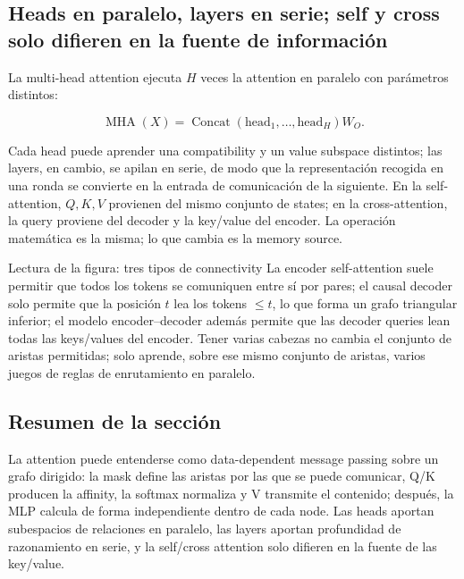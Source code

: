 \subsection{Heads en paralelo, layers en serie; self y cross solo difieren en la fuente de información}

La multi-head attention ejecuta $H$ veces la attention en paralelo con parámetros distintos:

\[
\operatorname{MHA}(X)=\operatorname{Concat}(\text{head}_1,\ldots,\text{head}_H)W_O.
\]

Cada head puede aprender una compatibility y un value subspace distintos; las layers, en cambio, se apilan en serie, de modo que la representación recogida en una ronda se convierte en la entrada de comunicación de la siguiente. En la self-attention, $Q,K,V$ provienen del mismo conjunto de states; en la cross-attention, la query proviene del decoder y la key/value del encoder. La operación matemática es la misma; lo que cambia es la memory source.


\begin{knowledgebox}{Lectura de la figura: tres tipos de connectivity}
La encoder self-attention suele permitir que todos los tokens se comuniquen entre sí por pares; el causal decoder solo permite que la posición $t$ lea los tokens $\le t$, lo que forma un grafo triangular inferior; el modelo encoder--decoder además permite que las decoder queries lean todas las keys/values del encoder. Tener varias cabezas no cambia el conjunto de aristas permitidas; solo aprende, sobre ese mismo conjunto de aristas, varios juegos de reglas de enrutamiento en paralelo.
\end{knowledgebox}


\subsection{Resumen de la sección}

La attention puede entenderse como data-dependent message passing sobre un grafo dirigido: la mask define las aristas por las que se puede comunicar, Q/K producen la affinity, la softmax normaliza y V transmite el contenido; después, la MLP calcula de forma independiente dentro de cada node. Las heads aportan subespacios de relaciones en paralelo, las layers aportan profundidad de razonamiento en serie, y la self/cross attention solo difieren en la fuente de las key/value.
